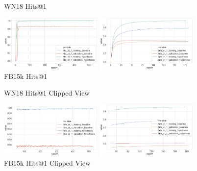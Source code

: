 \begin{figure}[H]
	\parbox{.5\linewidth}{
   		\caption{WN18 Hits@1}
   		\centering
    		\includegraphics[width=0.45\textwidth, height=0.2\textheight]{WN18_hits_at_1_Results}
		}
	\hfill
	\parbox{.5\linewidth}{
		\caption{FB15k Hits@1}
   		\centering
		\includegraphics[width=0.45\textwidth, height=0.2\textheight]{FB15k_hits_at_1_Results}
		}
\end{figure}

\begin{figure}[H]
	\parbox{.5\linewidth}{
   		\caption{WN18 Hits@1 Clipped View}
   		\centering
    		\includegraphics[width=0.45\textwidth, height=0.2\textheight]{WN18_hits_at_1_Results_Clipped}
		}
	\hfill
	\parbox{.5\linewidth}{
		\caption{FB15k Hits@1  Clipped View}
   		\centering
		\includegraphics[width=0.45\textwidth, height=0.2\textheight]{FB15k_hits_at_1_Results_Clipped}
		}
\end{figure}



